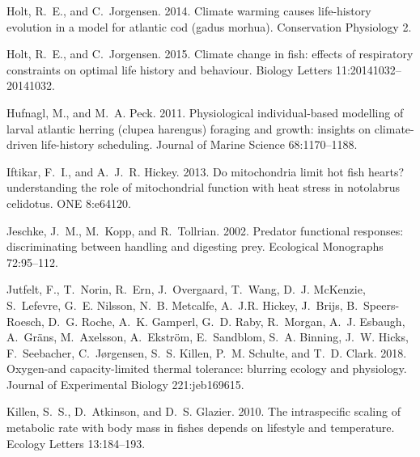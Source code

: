 \documentclass[11pt]{article}\usepackage[]{graphicx}\usepackage[]{color,soul}
\begin{document}
\begin{thebibliography}{55}
Holt, R.~E., and C.~Jorgensen. 2014.
\newblock Climate warming causes life-history evolution in a model for atlantic
  cod (gadus morhua).
\newblock Conservation Physiology 2.

Holt, R.~E., and C.~Jorgensen. 2015.
\newblock Climate change in fish: effects of respiratory constraints on optimal
  life history and behaviour.
\newblock Biology Letters 11:20141032--20141032.

Hufnagl, M., and M.~A. Peck. 2011.
\newblock Physiological individual-based modelling of larval atlantic herring
  (clupea harengus) foraging and growth: insights on climate-driven
  life-history scheduling.
 Journal of Marine Science 68:1170--1188.

Iftikar, F.~I., and A.~J.~R. Hickey. 2013.
\newblock Do mitochondria limit hot fish hearts? understanding the role of
  mitochondrial function with heat stress in notolabrus celidotus.
 {ONE} 8:e64120.

Jeschke, J.~M., M.~Kopp, and R.~Tollrian. 2002.
\newblock Predator functional responses: discriminating between handling and
  digesting prey.
\newblock Ecological Monographs 72:95--112.

Jutfelt, F., T.~Norin, R.~Ern, J.~Overgaard, T.~Wang, D.~J. {McKenzie},
  S.~Lefevre, G.~E. Nilsson, N.~B. Metcalfe, A.~J.R. Hickey, J.~Brijs, B.~Speers-Roesch, D.~G. Roche, A.~K. Gamperl, G.~D. Raby, R.~Morgan, A.~J. Esbaugh, A.~Gr{\"a}ns, M.~Axelsson, A.~Ekstr{\"o}m, E.~Sandblom, S.~A. Binning, J.~W. Hicks, F.~Seebacher, C.~J{\o}rgensen, S.~S. Killen, P.~M. Schulte, and T.~D. Clark. 2018.
\newblock Oxygen-and capacity-limited thermal tolerance: blurring ecology and
  physiology.
\newblock Journal of Experimental Biology 221:jeb169615.

Killen, S.~S., D.~Atkinson, and D.~S. Glazier. 2010.
\newblock The intraspecific scaling of metabolic rate with body mass in fishes
  depends on lifestyle and temperature.
\newblock Ecology Letters 13:184--193.


\end{thebibliography}
\end{document}

